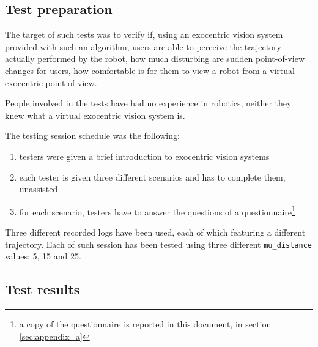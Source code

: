 \subsection{Test preparation}
\label{subsec:testpreparation}
%
The target of such tests was to verify  if, using 
an exocentric vision system provided with such an algorithm, 
users are able to perceive the trajectory actually 
performed by the robot,  how much disturbing are 
sudden point-of-view changes for users,  how 
comfortable is for them to view a robot from a 
virtual exocentric point-of-view.
%

%
People involved in the tests have had no experience in 
robotics, neither they knew what a virtual exocentric 
vision system is.
%

%
The testing session schedule was the following:
\begin{enumerate}
  \item testers were given a brief introduction to exocentric vision systems
  \item each tester is given three different scenarios and has to 
    complete them, unassisted
  \item for each scenario, testers have to answer the questions 
    of a questionnaire\footnote{a copy of the questionnaire is 
      reported in this document, in section \ref{sec:appendix_a}}
\end{enumerate}
%

%
Three different recorded logs have been used, each of which featuring 
a different trajectory. Each of such session has been tested
using three different \texttt{mu\_distance} values: 5, 15 and 25. 
%
\subsection{Test results}
